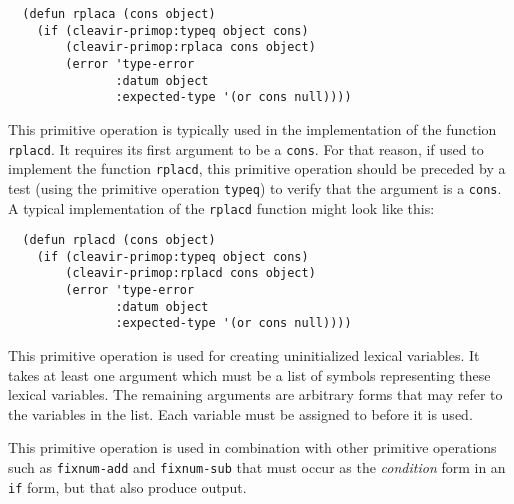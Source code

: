 \begin{verbatim}
  (defun rplaca (cons object)
    (if (cleavir-primop:typeq object cons)
        (cleavir-primop:rplaca cons object)
        (error 'type-error
               :datum object
               :expected-type '(or cons null))))
\end{verbatim}


This primitive operation is typically used in the implementation of
the \commonlisp{} function \texttt{rplacd}.  It requires its first
argument to be a \texttt{cons}.  For that reason, if used to implement
the \commonlisp{} function \texttt{rplacd}, this primitive operation
should be preceded by a test (using the primitive operation
\texttt{typeq}) to verify that the argument is a \texttt{cons}.  A
typical implementation of the \texttt{rplacd} function might look like
this:

\begin{verbatim}
  (defun rplacd (cons object)
    (if (cleavir-primop:typeq object cons)
        (cleavir-primop:rplacd cons object)
        (error 'type-error
               :datum object
               :expected-type '(or cons null))))
\end{verbatim}


This primitive operation is used for creating uninitialized lexical
variables.  It takes at least one argument which must be a list of
symbols representing these lexical variables.  The remaining arguments
are arbitrary forms that may refer to the variables in the list.  Each
variable must be assigned to before it is used.

This primitive operation is used in combination with other primitive
operations such as \texttt{fixnum-add} and \texttt{fixnum-sub} that
must occur as the \emph{condition} form in an \texttt{if} form, but
that also produce output.
